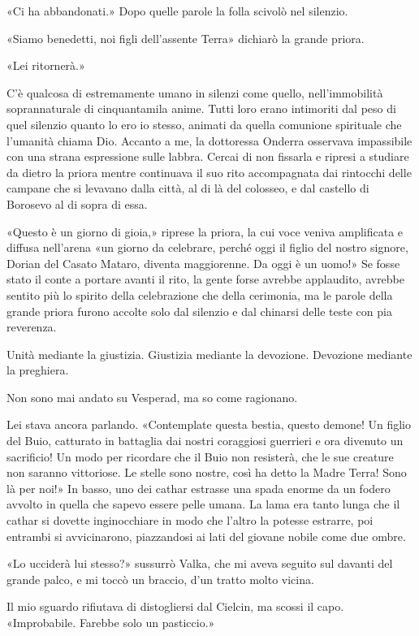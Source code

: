 «Ci ha abbandonati.» Dopo quelle parole la folla scivolò nel silenzio.

«Siamo benedetti, noi figli dell'assente Terra» dichiarò la grande
priora.

«Lei ritornerà.»

C'è qualcosa di estremamente umano in silenzi come quello,
nell'immobilità soprannaturale di cinquantamila anime. Tutti loro erano
intimoriti dal peso di quel silenzio quanto lo ero io stesso, animati da
quella comunione spirituale che l'umanità chiama Dio. Accanto a me, la
dottoressa Onderra osservava impassibile con una strana espressione
sulle labbra. Cercai di non fissarla e ripresi a studiare da dietro la
priora mentre continuava il suo rito accompagnata dai rintocchi delle
campane che si levavano dalla città, al di là del colosseo, e dal
castello di Borosevo al di sopra di essa.

«Questo è un giorno di gioia,» riprese la priora, la cui voce veniva
amplificata e diffusa nell'arena «un giorno da celebrare, perché oggi il
figlio del nostro signore, Dorian del Casato Mataro, diventa
maggiorenne. Da oggi è un uomo!» Se fosse stato il conte a portare
avanti il rito, la gente forse avrebbe applaudito, avrebbe sentito più
lo spirito della celebrazione che della cerimonia, ma le parole della
grande priora furono accolte solo dal silenzio e dal chinarsi delle
teste con pia reverenza.

Unità mediante la giustizia. Giustizia mediante la devozione. Devozione
mediante la preghiera.

Non sono mai andato su Vesperad, ma so come ragionano.

Lei stava ancora parlando. «Contemplate questa bestia, questo demone! Un
figlio del Buio, catturato in battaglia dai nostri coraggiosi guerrieri
e ora divenuto un sacrificio! Un modo per ricordare che il Buio non
resisterà, che le sue creature non saranno vittoriose. Le stelle sono
nostre, così ha detto la Madre Terra! Sono là per noi!» In basso, uno
dei cathar estrasse una spada enorme da un fodero avvolto in quella che
sapevo essere pelle umana. La lama era tanto lunga che il cathar si
dovette inginocchiare in modo che l'altro la potesse estrarre, poi
entrambi si avvicinarono, piazzandosi ai lati del giovane nobile come
due ombre.

«Lo ucciderà lui stesso?» sussurrò Valka, che mi aveva seguito sul
davanti del grande palco, e mi toccò un braccio, d'un tratto molto
vicina.

Il mio sguardo rifiutava di distogliersi dal Cielcin, ma scossi il capo.
«Improbabile. Farebbe solo un pasticcio.»


